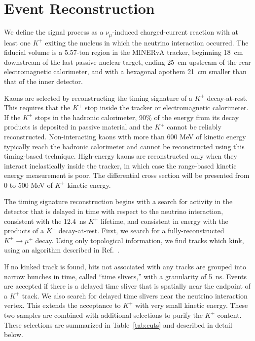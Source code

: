 \documentclass[aps,prl,preprint,showpacs,superscriptaddress,nofootinbib,floatfix,linenumbers]{revtex4}
\newcommand{\minerva}{MINERvA\xspace}
\newcommand{\numu}{\ensuremath{\nu_{\mu}}\xspace}
\newcommand{\kp}{\ensuremath{K^{+}}\xspace}
\begin{document}
\section{Event Reconstruction}
\label{sec:reco}

We define the signal process as a \numu-induced charged-current reaction with at least one \kp exiting the nucleus in which the neutrino interaction occurred. The fiducial volume is a 5.57-ton region in the \minerva tracker, beginning 18~cm downstream of the last passive nuclear target, ending 25~cm upstream of the rear electromagnetic calorimeter, and with a hexagonal apothem 21~cm smaller than that of the inner detector.

Kaons are selected by reconstructing the timing signature of a \kp decay-at-rest. This requires that the \kp stop inside the tracker or electromagnetic calorimeter. If the \kp stops in the hadronic calorimeter, 90\% of the energy from its decay products is deposited in passive material and the \kp cannot be reliably reconstructed. Non-interacting kaons with more than 600 MeV of kinetic energy typically reach the hadronic calorimeter and cannot be reconstructed using this timing-based technique. High-energy kaons are reconstructed only when they interact inelastically inside the tracker, in which case the range-based kinetic energy measurement is poor. The differential cross section will be presented from 0 to 500 MeV of \kp kinetic energy.

The timing signature reconstruction begins with a search for activity in the detector that is delayed in time with respect to the neutrino interaction, consistent with the 12.4~ns \kp lifetime, and consistent in energy with the products of a \kp decay-at-rest. First, we search for a fully-reconstructed $K^{+} \rightarrow \mu^{+}$ decay. Using only topological information, we find tracks which kink, using an algorithm described in Ref.~\cite{minerva_nim}.

If no kinked track is found, hits not associated with any tracks are grouped into narrow bunches in time, called ``time slivers,'' with a granularity of 5~ns. Events are accepted if there is a delayed time sliver that is spatially near the endpoint of a \kp track. We also search for delayed time slivers near the neutrino interaction vertex. This extends the acceptance to \kp with very small kinetic energy. These two samples are combined with additional selections to purify the \kp content. These selections are summarized in Table~\ref{tab:cuts} and described in detail below.
\end{document}
